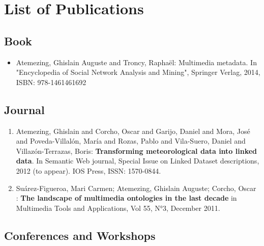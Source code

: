 

\chapter*{List of Publications}

\section*{Book}
\label{sec:book}
\begin{itemize}
\item {A}temezing, {G}hislain {A}uguste and  {T}roncy, {R}apha{\"e}l: {M}ultimedia metadata. {I}n "{E}ncyclopedia of {S}ocial {N}etwork {A}nalysis and {M}ining", {S}pringer {V}erlag, 2014, {ISBN}: 978-1461461692 
\end{itemize}

\section*{Journal}
\label{sec:journal}
\begin{enumerate}

\item {A}temezing, {G}hislain and  {C}orcho, {O}scar and  {G}arijo, {D}aniel and  {M}ora, {J}os{\'e} and  {P}oveda-{V}illal{\'o}n, {M}ar{\'i}a and  {R}ozas, {P}ablo and  {V}ila-{S}uero, {D}aniel and  {V}illaz{\'o}n-{T}errazas, {B}oris: \textbf{{T}ransforming meteorological data into linked data}. In {S}emantic {W}eb journal, {S}pecial {I}ssue on {L}inked {D}ataset descriptions, 2012 (to appear). {IOS} {P}ress, {ISSN}: 1570-0844.

\item Su\'{a}rez-Figueroa, Mari Carmen; Atemezing, Ghislain Auguste; Corcho, Oscar : \textbf{The landscape of 
multimedia ontologies in the last decade} in  Multimedia Tools and Applications, Vol 55, N°3, December 2011.

\end{enumerate}

\section*{Conferences and Workshops}\label{sec:conf}

